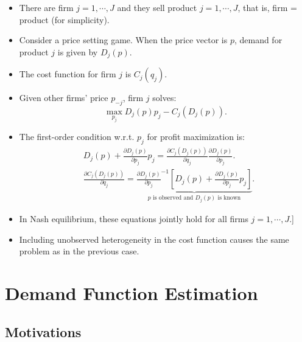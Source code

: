 \documentclass[
]{book}
\begin{document}
\begin{itemize}
\item
  There are firm \(j = 1, \cdots, J\) and they sell product \(j = 1, \cdots, J\), that is, firm = product (for simplicity).
\item
  Consider a price setting game. When the price vector is \(p\), demand for product \(j\) is given by \(D_j(p)\).
\item
  The cost function for firm \(j\) is \(C_j(q_j)\).
\item
  Given other firms' price \(p_{-j}\), firm \(j\) solves:
  \begin{equation}
  \max_{p_j} D_j(p) p_j - C_j(D_j(p)).
  \end{equation}
\item
  The first-order condition w.r.t. \(p_j\) for profit maximization is:
  \begin{equation}
  \begin{split}
  &D_j(p) + \frac{\partial D_j(p)}{\partial p_j} p_j = \frac{\partial C_j(D_j(p))}{\partial q_j} \frac{\partial D_j(p)}{\partial p_j}.\\
  &\frac{\partial C_j(D_j(p))}{\partial q_j} = \underbrace{\frac{\partial D_j(p)}{\partial p_j}^{-1}[D_j(p) + \frac{\partial D_j(p)}{\partial p_j} p_j ]}_{\text{$p$ is observed and $D_j(p)$ is known}}.
  \end{split}
  \end{equation}
\item
  In Nash equilibrium, these equations jointly hold for all firms \(j = 1, \cdots, J\).{]}
\item
  Including unobserved heterogeneity in the cost function causes the same problem as in the previous case.
\end{itemize}

\hypertarget{demand}{%
\chapter{Demand Function Estimation}\label{demand}}

\hypertarget{motivations-1}{%
\section{Motivations}\label{motivations-1}}
\end{document}
